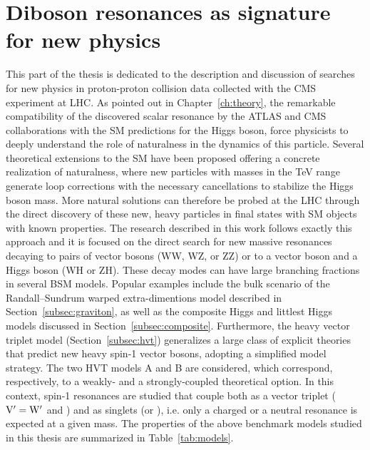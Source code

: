 \chapter{Diboson resonances as signature for new physics}
\label{ch:dibosonIntro}

This part of the thesis is dedicated to the description and discussion of searches for new physics in proton-proton collision data collected with the CMS experiment at LHC.
As pointed out in Chapter~\ref{ch:theory}, the remarkable compatibility of the discovered scalar resonance by the ATLAS and CMS collaborations with the SM predictions for the Higgs boson,
force physicists to deeply understand the role of naturalness in the dynamics of this particle.
Several theoretical extensions to the SM have been proposed offering a concrete realization of naturalness,
where new particles with masses in the TeV range generate loop corrections with the necessary cancellations to stabilize the Higgs boson mass.
More natural solutions can therefore be probed at the LHC through the direct discovery of these new, heavy particles in final states with SM objects with known properties.
The research described in this work follows exactly this approach and it is focused on the direct search for new massive resonances decaying to
pairs of vector bosons (WW, WZ, or ZZ) or to a vector boson and a Higgs boson (WH or ZH).
These decay modes can have large branching fractions in several BSM models. 
Popular examples include the bulk scenario of the Randall--Sundrum warped extra-dimentions model described in Section~\ref{subsec:graviton},
as well as the composite Higgs and littlest Higgs models discussed in Section~\ref{subsec:composite}.
Furthermore, the heavy vector triplet model (Section~\ref{subsec:hvt}) generalizes a large class of explicit theories that predict new heavy spin-1 vector bosons,
adopting a simplified model strategy. The two HVT models A and B are considered, which correspond, respectively, to a weakly- and a strongly-coupled theoretical option.
In this context, spin-1 resonances are studied that couple both as a vector triplet ($\mathrm{V}^\prime = \mathrm{W}^\prime$ and \Zpr) and as singlets (\Wpr or \Zpr), i.e. only a charged or a neutral resonance is expected at a given mass.
The properties of the above benchmark models studied in this thesis are summarized in Table~\ref{tab:models}.\\

